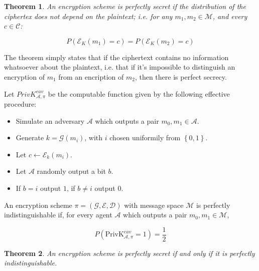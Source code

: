 \documentclass[a4paper, 12pt]{article}
\newtheorem{theorem}{Theorem}
\newtheorem{theorem}{Theorem}
\begin{document}
\begin{theorem}
    An encryption scheme is perfectly secret if the distribution of the 
    ciphertex does not depend on the plaintext; i.e. for any $m_1, m_2 \in \mathcal{M}$,
    and every $c \in \mathcal{C}$:

    \begin{equation*}
        P\left( \mathcal{E}_K(m_1) = c \right) = P\left( \mathcal{E}_K(m_2) = c \right) 
    \end{equation*}
\end{theorem}

The theorem simply states that if the ciphertext contains no information 
whatsoever about the plaintext, i.e. that if it's impossible to distinguish 
an encryption of $m_1$ from an encription of $m_2$, then there is perfect 
secrecy.

\begin{definition}
    Let $PrivK_{\mathcal{A}, \pi}^{eav}$ be the computable function given by the following 
    effective procedure:

    \begin{itemize}
        \item Simulate an adversary $\mathcal{A}$ which outputs a pair $m_0, m_1 \in \mathcal{A}$.
        \item Generate $k = \mathcal{G}(m_i)$, with $i$ chosen uniformily 
            from $\left\{ 0, 1 \right\} $.
        \item Let $c \leftarrow \mathcal{E}_k(m_i)$.
        \item Let $\mathcal{A}$ randomly output a bit $b$.
        \item If $b = i$ output $1$, if $b \neq i$ 
            output 0.
    \end{itemize}
\end{definition}

\begin{definition}
    An encryption scheme $\pi = \left( \mathcal{G}, \mathcal{E}, \mathcal{D} \right) $ 
    with message space $\mathcal{M}$ is perfectly indistinguishable if, 
    for every agent $\mathcal{A}$ which outputs a pair $m_0, m_1 \in \mathcal{M}$,

    \begin{equation*}
        P \left( \text{PrivK}_{\mathcal{A}, \pi}^{eav} = 1 \right) = \frac{1}{2}
    \end{equation*}
\end{definition}

\begin{theorem}
    An encryption scheme is perfectly secret if and only if it is perfectly 
    indistinguishable.
\end{theorem}
\end{document}
